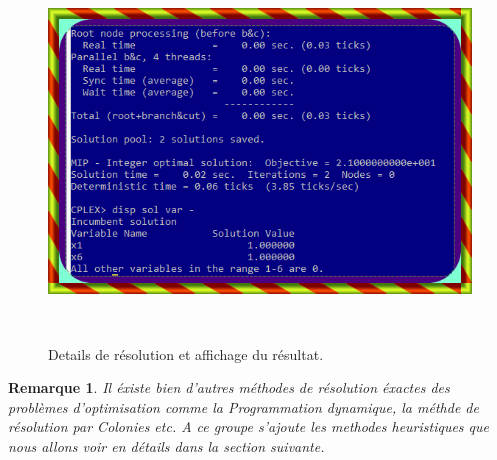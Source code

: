 \documentclass[a4paper,11pt,oneside]{report}
\newtheorem{remarque}{Remarque}[section]
\theoremstyle{plain}
\newcommand{\0}{/ \! \! \! 0}
\theoremstyle{plain}
\begin{document}
  \newpage
 \begin{figure}[htbp]
  \begin{center}
  \includegraphics[height=10cm,width=16cm]{tp2.png}
  \caption{\label{fig2} Details de r\'esolution et affichage du r\'esultat.}
  \end{center}
  \end{figure}
\begin{remarque}
Il \'existe bien d'autres m\'ethodes de r\'esolution \'exactes des probl\`emes d'optimisation comme la Programmation dynamique, la m\'ethde 
de r\'esolution par Colonies etc. A ce groupe s'ajoute les methodes heuristiques que nous allons voir en d\'etails dans la section suivante.
\end{remarque}\newpage
\end{document}
